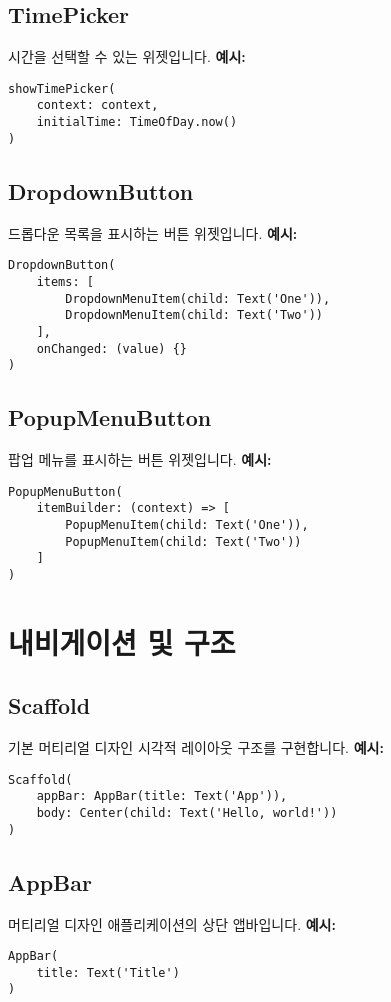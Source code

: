 \documentclass{article}
\begin{document}
\subsection*{TimePicker}
시간을 선택할 수 있는 위젯입니다.
\textbf{예시:}
\begin{lstlisting}
showTimePicker(
    context: context,
    initialTime: TimeOfDay.now()
)
\end{lstlisting}

\subsection*{DropdownButton}
드롭다운 목록을 표시하는 버튼 위젯입니다.
\textbf{예시:}
\begin{lstlisting}
DropdownButton(
    items: [
        DropdownMenuItem(child: Text('One')),
        DropdownMenuItem(child: Text('Two'))
    ],
    onChanged: (value) {}
)
\end{lstlisting}

\subsection*{PopupMenuButton}
팝업 메뉴를 표시하는 버튼 위젯입니다.
\textbf{예시:}
\begin{lstlisting}
PopupMenuButton(
    itemBuilder: (context) => [
        PopupMenuItem(child: Text('One')),
        PopupMenuItem(child: Text('Two'))
    ]
)
\end{lstlisting}

\section*{내비게이션 및 구조}
\subsection*{Scaffold}
기본 머티리얼 디자인 시각적 레이아웃 구조를 구현합니다.
\textbf{예시:}
\begin{lstlisting}
Scaffold(
    appBar: AppBar(title: Text('App')),
    body: Center(child: Text('Hello, world!'))
)
\end{lstlisting}

\subsection*{AppBar}
머티리얼 디자인 애플리케이션의 상단 앱바입니다.
\textbf{예시:}
\begin{lstlisting}
AppBar(
    title: Text('Title')
)
\end{lstlisting}
\end{document}
